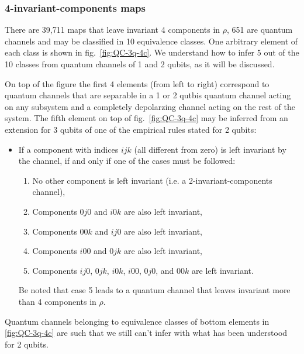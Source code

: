 \documentclass[11pt,dvipsnames]{article} %
\newcommand{\fref}[1]{fig.~\ref{#1}}  \newcommand{\tref}[1]{table~\ref{#1}}
\newcommand{\1}{\mathds{1}}
\begin{document}


\subsubsection*{4-invariant-components maps} %
There are 39,711 maps that leave invariant 4 components in $\rho$, 651
are quantum channels and may be classified in 10 equivalence classes.
One arbitrary element of each class is shown in \fref{fig:QC-3q-4c}. 
We understand how to infer 5 out of the 10 classes from quantum channels
of 1 and 2 qubits, as it will be discussed.


On top of the figure the first 4 elements
(from left to right) correspond to quantum channels that are separable
in a 1 or 2 qutbis quantum channel acting on any subsystem 
and a completely depolarzing channel acting on the rest of the system.
The fifth element on top of \fref{fig:QC-3q-4c} may be inferred from
an extension for 3 qubits of one of the empirical rules stated for 2 qubits: 
\begin{itemize}
	\item If a component with indices $ijk$ (all different from zero) is
	left invariant by the channel, if and only if one of the cases must be followed:
	\begin{enumerate}
		\item No other component is left invariant (i.e. a 2-invariant-components
		channel),
		\item Components $0j0$ and $i0k$ are also left invariant,
		\item Components $00k$ and $ij0$ are also left invariant,
		\item Components $i00$ and $0jk$ are also left invariant,
		\item Components $ij0$, $0jk$, $i0k$, $i00$, $0j0$, and
		$00k$ are left invariant.
	\end{enumerate}
	Be noted that case 5 leads to a quantum channel that leaves invariant
	more than 4 components in $\rho$.
\end{itemize}
Quantum channels belonging to equivalence classes of bottom elements in 
\ref{fig:QC-3q-4c} are such that we still can't infer with what has 
been understood for 2 qubits.
\end{document}
